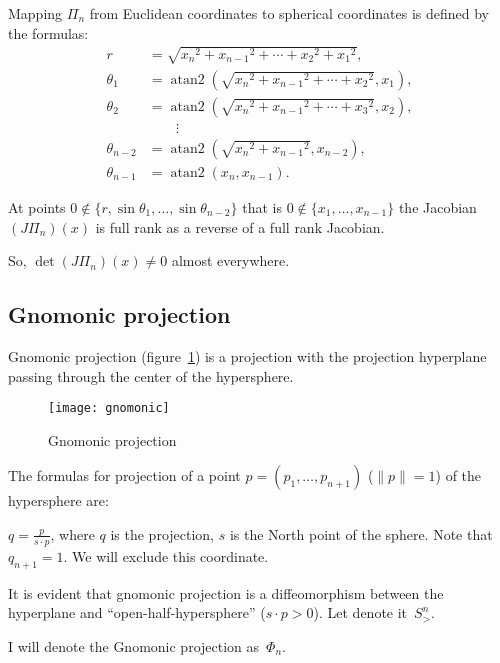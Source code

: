 \documentclass[oneside,draft]{amsart}
\newcommand{\norm}[1]{\lVert #1\rVert}
\begin{document}
Mapping $\Pi_n$ from Euclidean coordinates to spherical coordinates is defined by the formulas:
\[
\begin{aligned}r&={\textstyle {\sqrt {{x_{n}}^{2}+{x_{n-1}}^{2}+\cdots +{x_{2}}^{2}+{x_{1}}^{2}}}},\\\theta _{1}&=\operatorname {atan2} \left({\textstyle {\sqrt {{x_{n}}^{2}+{x_{n-1}}^{2}+\cdots +{x_{2}}^{2}}}},x_{1}\right),\\\theta _{2}&=\operatorname {atan2} \left({\textstyle {\sqrt {{x_{n}}^{2}+{x_{n-1}}^{2}+\cdots +{x_{3}}^{2}}}},x_{2}\right),\\&\qquad \vdots \\\theta _{n-2}&=\operatorname {atan2} \left({\textstyle {\sqrt {{x_{n}}^{2}+{x_{n-1}}^{2}}}},x_{n-2}\right),\\\theta _{n-1}&=\operatorname {atan2} \left(x_{n},x_{n-1}\right).\end{aligned}
\]  

At points $0\notin\{r,\sin\theta_1,\dots,\sin\theta_{n-2}\}$ that is $0\notin\{x_1,\dots,x_{n-1}\}$ the Jacobian $(J\Pi_n)(x)$
is full rank as a reverse of a full rank Jacobian.

So, $\det (J\Pi_n)(x)\ne 0$ almost everywhere.

\subsection{Gnomonic projection}

Gnomonic projection (figure~\ref{fig:gnomonic}) is a projection with the projection hyperplane passing through the center of the hypersphere.

\begin{figure}[hbt]
    \centering
    \texttt{[image: gnomonic]}
    \caption{Gnomonic projection}
    \label{fig:gnomonic}
\end{figure}

The formulas for projection of a point $p=(p_1,\dots,p_{n+1})$ ($\norm{p} = 1$) of the hypersphere are:

$q=\frac{p}{s\cdot p}$, where $q$ is the projection, $s$ is the North point of the sphere. Note that $q_{n+1}=1$. We will exclude this coordinate.

It is evident that gnomonic projection is a diffeomorphism between the hyperplane and ``open-half-hy\-per\-sphe\-re'' ($s\cdot p>0$). Let denote it~$S^n_{>}$.

I will denote the Gnomonic projection as~$\Phi_n$.
\end{document}

